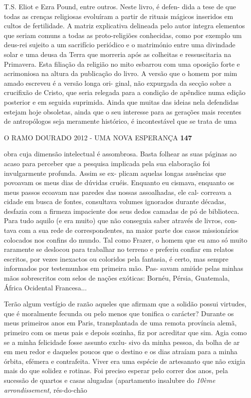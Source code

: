 T.S. Eliot e Ezra Pound, entre outros. Neste livro, é defen- dida a tese
de que todas as crenças religiosas evoluíram a partir de rituais mágicos
inseridos em cultos de fertilidade. A matriz explicativa delineada pelo
autor integra elementos que seriam comuns a todas as proto-religiões
conhecidas, como por exemplo um deus-rei sujeito a um sacrifício
periódico e o matrimónio entre uma divindade solar e uma deusa da Terra
que morreria após as colheitas e ressuscitaria na Primavera. Esta
filiação da religião no mito esbarrou com uma oposição forte e
acrimoniosa na altura da publicação do livro. A versão que o homem por
mim amado escreveu é a versão longa ori- ginal, não expurgada da secção
sobre a crucifixão de Cristo, que seria relegada para a condição de
apêndice numa edição posterior e em seguida suprimida. Ainda que muitas
das ideias nela defendidas estejam hoje obsoletas, ainda que o seu
interesse para as gerações mais recentes de antropólogos seja meramente
histórico, é incontestável que se trata de uma

O RAMO DOURADO 2012 - UMA NOVA ESPERANÇA \textbf{147}

obra cuja dimensão intelectual é assombrosa. Basta folhear as suas
páginas ao acaso para perceber que a pesquisa implicada pela sua
elaboração foi invulgarmente profunda. Assim se ex- plicam aquelas
longas ausências que povoavam os meus dias de dúvidas cruéis. Enquanto
eu cismava, enquanto os meus passos ecoavam nas paredes das nossas
assoalhadas, ele cal- correava a cidade em busca de fontes, consultava
volumes ignorados durante décadas, desfazia com a firmeza impaciente dos
seus dedos camadas de pó de biblioteca. Para tudo aquilo (e era muito)
que não conseguia saber através de livros, con- tava com a sua rede de
correspondentes, na maior parte dos casos missionários colocados nos
confins do mundo. Tal como Frazer, o homem que eu amo só muito raramente
se deslocou para trabalhar no terreno e preferiu confiar em relatos
escritos, por vezes inexactos ou coloridos pela fantasia, é certo, mas
sempre informados por testemunhos em primeira mão. Pas- savam amiúde
pelas minhas mãos sobrescritos com selos de nações exóticas: Bornéu,
Pérsia, Guatemala, África Ocidental Francesa...

Terão algum vestígio de razão aqueles que afirmam que a solidão possui
virtudes, que é moralmente fecunda ou pelo menos que tonifica o
carácter? Durante os meus primeiros anos em Paris, transplantada de uma
remota província alemã, primeiro com os meus pais e depois sozinha, fiz
por acreditar que sim. Agia como se a minha felicidade fosse assunto
exclu- sivo da minha pessoa, da bolha de ar em meu redor e daqueles
poucos que o destino e os dias atraíam para a minha órbita, efémera e
contrafeita. Viver era uma espécie de artesanato que não exigia mais do
que solidez e rotinas. Foi preciso esperar pelo correr dos anos, pela
sucessão de quartos e casas alugadas (apartamento insalubre do
\emph{10ème arrondissement, }rés-do-chão

